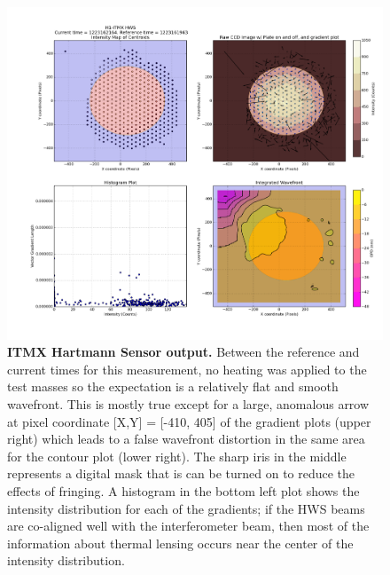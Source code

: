 \begin{figure}[ht]
	\centering
	\includegraphics[width=0.7\textheight]{../Figures/20181011_ITMX_HWS_histogram_Masked.png}
	\caption[ITMX Hartmann Sensor output.] 
	{\textbf{ITMX Hartmann Sensor output.} Between the reference and current times for this measurement, no heating was applied to the test masses so the expectation is a relatively flat and smooth wavefront. This is mostly true except for a large, anomalous arrow at pixel coordinate [X,Y] = [-410, 405] of the gradient plots (upper right) which leads to a false wavefront distortion in the same area for the contour plot (lower right).  The sharp iris in the middle represents a digital mask that is can be turned on to reduce the effects of fringing.  A histogram in the bottom left plot shows the intensity distribution for each of the gradients; if the HWS beams are co-aligned well with the interferometer beam, then most of the information about thermal lensing occurs near the center of the intensity distribution.}
	\label{fig:HWS_Histogram}
\end{figure}

